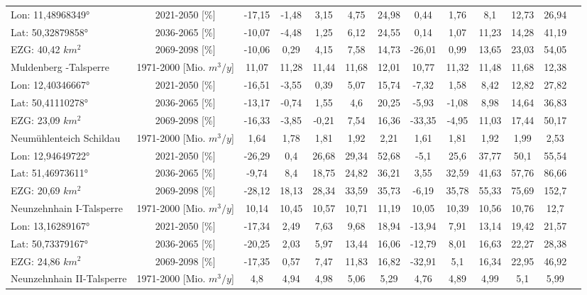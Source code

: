 \begin{longtable}{@{\extracolsep{\fill}}lc|ccccc||cccccc}
\cline{2-13} 
Lon: 11,48968349° & 2021-2050 [\%]  & -17,15 & -1,48 & 3,15 & 4,75 & 24,98 & 0,44 & 1,76 & 8,1 & 12,73 & 26,94 & \\ 
Lat: 50,32879858° & 2036-2065 [\%]  & -10,07 & -4,48 & 1,25 & 6,12 & 24,55 & 0,14 & 1,07 & 11,23 & 14,28 & 41,19 & \\ 
EZG: 40,42 $km^2$ & 2069-2098 [\%]  & -10,06 & 0,29 & 4,15 & 7,58 & 14,73 & -26,01 & 0,99 & 13,65 & 23,03 & 54,05 & \\ 
\hline 
Muldenberg -Talsperre & 1971-2000 [Mio. $m^3/y$]  & 11,07 & 11,28 & 11,44 & 11,68 & 12,01 & 10,77 & 11,32 & 11,48 & 11,68 & 12,38 & \\ 
\cline{2-13} 
Lon: 12,40346667° & 2021-2050 [\%]  & -16,51 & -3,55 & 0,39 & 5,07 & 15,74 & -7,32 & 1,58 & 8,42 & 12,82 & 27,82 & \\ 
Lat: 50,41110278° & 2036-2065 [\%]  & -13,17 & -0,74 & 1,55 & 4,6 & 20,25 & -5,93 & -1,08 & 8,98 & 14,64 & 36,83 & \\ 
EZG: 23,09 $km^2$ & 2069-2098 [\%]  & -16,33 & -3,85 & -0,21 & 7,54 & 16,36 & -33,35 & -4,95 & 11,03 & 17,44 & 50,17 & \\ 
\hline 
Neumühlenteich Schildau & 1971-2000 [Mio. $m^3/y$]  & 1,64 & 1,78 & 1,81 & 1,92 & 2,21 & 1,61 & 1,81 & 1,92 & 1,99 & 2,53 & \\ 
\cline{2-13} 
Lon: 12,94649722° & 2021-2050 [\%]  & -26,29 & 0,4 & 26,68 & 29,34 & 52,68 & -5,1 & 25,6 & 37,77 & 50,1 & 55,54 & \\ 
Lat: 51,46973611° & 2036-2065 [\%]  & -9,74 & 8,4 & 18,75 & 24,82 & 36,21 & 3,55 & 32,59 & 41,63 & 57,76 & 86,66 & \\ 
EZG: 20,69 $km^2$ & 2069-2098 [\%]  & -28,12 & 18,13 & 28,34 & 33,59 & 35,73 & -6,19 & 35,78 & 55,33 & 75,69 & 152,7 & \\ 
\hline 
Neunzehnhain I-Talsperre & 1971-2000 [Mio. $m^3/y$]  & 10,14 & 10,45 & 10,57 & 10,71 & 11,19 & 10,05 & 10,39 & 10,56 & 10,76 & 12,7 & \\ 
\cline{2-13} 
Lon: 13,16289167° & 2021-2050 [\%]  & -17,34 & 2,49 & 7,63 & 9,68 & 18,94 & -13,94 & 7,91 & 13,14 & 19,42 & 21,57 & \\ 
Lat: 50,73379167° & 2036-2065 [\%]  & -20,25 & 2,03 & 5,97 & 13,44 & 16,06 & -12,79 & 8,01 & 16,63 & 22,27 & 28,38 & \\ 
EZG: 24,86 $km^2$ & 2069-2098 [\%]  & -17,35 & 0,57 & 7,47 & 11,83 & 16,82 & -32,91 & 5,1 & 16,34 & 22,95 & 46,92 & \\ 
\hline 
Neunzehnhain II-Talsperre & 1971-2000 [Mio. $m^3/y$]  & 4,8 & 4,94 & 4,98 & 5,06 & 5,29 & 4,76 & 4,89 & 4,99 & 5,1 & 5,99 & \\ 

\end{longtable}
